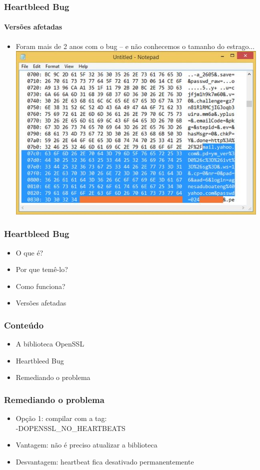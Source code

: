 \documentclass{beamer}
\begin{document}
\begin{frame}
	\frametitle{Heartbleed Bug}
	\framesubtitle{Versões afetadas}
	\begin{itemize}
		\item Foram mais de 2 anos com o bug -- e não conhecemos o tamanho do estrago...\\
		\includegraphics[scale=0.4]{yahoo.jpeg}
	\end{itemize}
\end{frame}

\begin{frame}
	\frametitle{Heartbleed Bug}
	\begin{itemize}
		\item \textcolor{covered}{O que é?}
		\item \textcolor{covered}{Por que temê-lo?}
		\item \textcolor{covered}{Como funciona?}
		\item \textcolor{covered}{Versões afetadas}
	\end{itemize}
\end{frame}

\begin{frame}
	\frametitle{Conteúdo}
	\begin{itemize}
		\item \textcolor{covered}{A biblioteca OpenSSL}
		\item \textcolor{covered}{Heartbleed Bug}
		\item Remediando o problema
	\end{itemize}
\end{frame}

\begin{frame}
	\frametitle{Remediando o problema}
	\begin{itemize}
		\item Opção 1: compilar com a tag:\\ \hspace{5 mm}-DOPENSSL\_NO\_HEARTBEATS
		\item Vantagem: não é preciso atualizar a biblioteca
		\item Desvantagem: heartbeat fica desativado permanentemente
	\end{itemize}
\end{frame}
\end{document}
